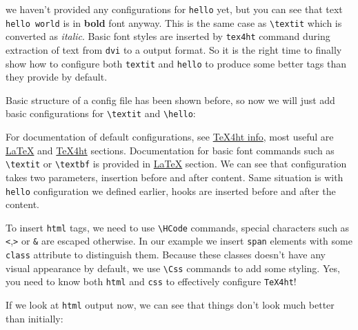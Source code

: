 we haven't provided any configurations for \texttt{hello} yet, but you
can see that text \texttt{hello\ world} is in \textbf{bold} font anyway.
This is the same case as \texttt{\textbackslash{}textit} which is
converted as \emph{italic}. Basic font styles are inserted by
\texttt{tex4ht} command during extraction of text from \texttt{dvi} to a
output format. So it is the right time to finally show how to configure
both \texttt{textit} and \texttt{hello} to produce some better tags than
they provide by default.

Basic structure of a config file has been shown before, so now we will
just add basic configurations for \texttt{\textbackslash{}textit} and
\texttt{\textbackslash{}hello}:

\begin{texsource}

\EndPreamble
\end{texsource}

For documentation of default configurations, see
\href{http://michal-h21.github.io/src4ht/tex4ht-info.html}{TeX4ht info},
most useful are
\href{http://michal-h21.github.io/src4ht/tex4ht-infose2.html}{LaTeX} and
\href{http://michal-h21.github.io/src4ht/tex4ht-infose1.html}{TeX4ht}
sections. Documentation for basic font commands such as
\texttt{\textbackslash{}textit} or \texttt{\textbackslash{}textbf} is
provided in
\href{http://michal-h21.github.io/src4ht/tex4ht-infose2.html}{LaTeX}
section. We can see that configuration takes two parameters, insertion
before and after content. Same situation is with \texttt{hello}
configuration we defined earlier, hooks are inserted before and after
the content.

To insert \texttt{html} tags, we need to use
\texttt{\textbackslash{}HCode} commands, special characters such as
\texttt{\textless{}},\texttt{\textgreater{}} or \texttt{\&} are escaped
otherwise. In our example we insert \texttt{span} elements with some
\texttt{class} attribute to distinguish them. Because these classes
doesn't have any visual appearance by default, we use
\texttt{\textbackslash{}Css} commands to add some styling. Yes, you need
to know both \texttt{html} and \texttt{css} to effectively configure
\texttt{TeX4ht}!

If we look at \texttt{html} output now, we can see that things don't
look much better than initially:

